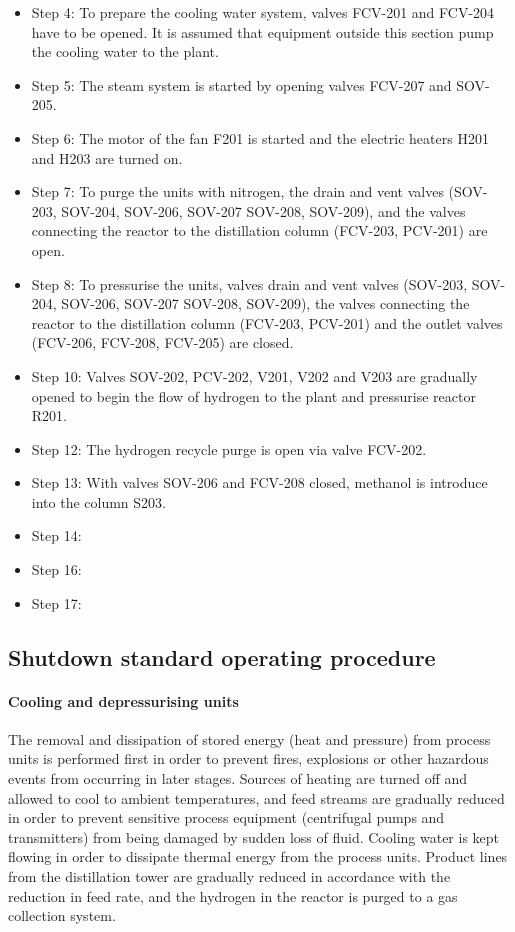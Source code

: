 \begin{itemize}
    \item Step 4: To prepare the cooling water system, valves FCV-201 and FCV-204 have to be opened. It is assumed that equipment outside this section pump the cooling water to the plant.
    \item Step 5: The steam system is started by opening valves FCV-207 and SOV-205.
    \item Step 6: The motor of the fan F201 is started and the electric heaters H201 and H203 are turned on. 
    \item Step 7: To purge the units with nitrogen, the drain and vent valves (SOV-203, SOV-204, SOV-206, SOV-207 SOV-208, SOV-209), and the valves connecting the reactor to the distillation column  (FCV-203, PCV-201) are open. 
    \item Step 8: To pressurise the units, valves drain and vent valves (SOV-203, SOV-204, SOV-206, SOV-207 SOV-208, SOV-209), the valves connecting the reactor to the distillation column (FCV-203, PCV-201) and the outlet valves (FCV-206, FCV-208, FCV-205) are closed. 
    \item Step 10: Valves SOV-202, PCV-202, V201, V202 and V203 are gradually opened to begin the flow of hydrogen to the plant and pressurise reactor R201.
    \item Step 12: The hydrogen recycle purge is open via valve FCV-202.
    \item Step 13: With valves SOV-206 and FCV-208 closed, methanol is introduce into the column S203.
    \item Step 14: 
    \item Step 16:
    \item Step 17:
\end{itemize}


\subsection{Shutdown standard operating procedure}

\paragraph{Cooling and depressurising units}
The removal and dissipation of stored energy (heat and pressure) from process units is performed first in order to prevent fires, explosions or other hazardous events from occurring in later stages. Sources of heating are turned off and allowed to cool to ambient temperatures, and feed streams are gradually reduced in order to prevent sensitive process equipment (centrifugal pumps and transmitters) from being damaged by sudden loss of fluid. Cooling water is kept flowing in order to dissipate thermal energy from the process units. Product lines from the distillation tower are gradually reduced in accordance with the reduction in feed rate, and the hydrogen in the reactor is purged to a gas collection system.


